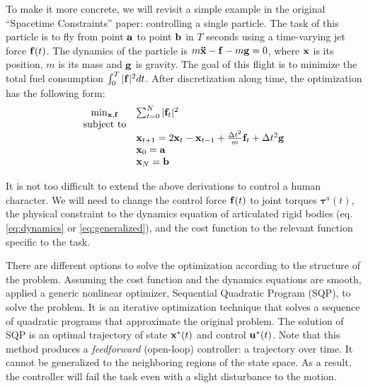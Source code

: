 To make it more concrete, we will revisit a simple example in the original ``Spacetime Constraints'' paper: controlling a single particle. The task of this particle is to fly from point $\mathbf{a}$ to point $\mathbf{b}$ in $T$ seconds using a time-varying jet force $\mathbf{f}(t)$. The dynamics of the particle is $m\mathbf{\ddot{x}}-\mathbf{f}-m\mathbf{g}=0$, where $\mathbf{x}$ is its position, $m$ is its mass and $\mathbf{g}$ is gravity. The goal of this flight is to minimize the total fuel consumption $\int_0^T|\mathbf{f}|^2dt$. After discretization along time, the optimization has the following form:
\begin{displaymath}
  \begin{array}{cl}
    \min_{\mathbf{x},\mathbf{f}}&\sum_{t=0}^{N}|\mathbf{f}_t|^2\\
    \textrm{subject to}&\\
    &\mathbf{x}_{t+1}= 2\mathbf{x}_{t} -\mathbf{x}_{t-1}+\frac{\Delta t^2}{m}\mathbf{f}_t+\Delta t^2\mathbf{g}\\
    &\mathbf{x}_0=\mathbf{a}\\
    &\mathbf{x}_N=\mathbf{b}
  \end{array}
  \end{displaymath}

It is not too difficult to extend the above derivations to control a human character. We will need to change the control force $\mathbf{f}(t)$ to joint torques $\boldsymbol{\tau}^a(t)$, the physical constraint to the dynamics equation of articulated rigid bodies (eq. \ref{eq:dynamics} or \ref{eq:generalized}), and the cost function to the relevant function specific to the task.

There are different options to solve the optimization according to the structure of the problem. Assuming the cost function and the dynamics equations are smooth, \citet{Witkin:1988} applied a generic nonlinear optimizer, Sequential Quadratic Program (SQP), to solve the problem. It is an iterative optimization technique that solves a sequence of quadratic programs that approximate the original problem. The solution of SQP is an optimal trajectory of state $\mathbf{x}^*(t)$ and control $\mathbf{u}^*(t)$. Note that this method produces a \emph{feedforward} (open-loop) controller: a trajectory over time. It cannot be generalized to the neighboring regions of the state space. As a result, the controller will fail the task even with a slight disturbance to the motion.

